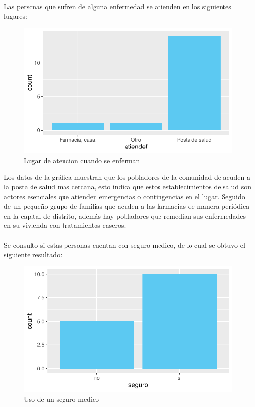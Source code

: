 \documentclass[12pt]{article}\usepackage[]{graphicx}\usepackage[]{xcolor}
\makeatletter
\def\maxwidth{ %
  \ifdim\Gin@nat@width>\linewidth
    \linewidth
  \else
    \Gin@nat@width
  \fi
}
\newenvironment{knitrout}{}{} %
\makeatother
\begin{document}
	\\
	Las personas que sufren de alguna enfermedad se atienden en los siguientes lugares:
	\begin{figure}[H]
	\centering
\begin{knitrout}
\color{fgcolor}
\includegraphics[width=\maxwidth]{figure/once-1} 
\end{knitrout}
	\caption{Lugar de atencion cuando se enferman}
	\end{figure}
  Los datos de la gráfica muestran que los pobladores de la comunidad de \comunidad acuden a la posta de salud mas cercana, esto indica que estos establecimientos de salud son actores esenciales que atienden emergencias o contingencias en el lugar. Seguido de un pequeño grupo de familias que acuden a las farmacias  de manera periódica en la capital de distrito, además hay pobladores que remedian sus enfermedades en su vivienda con tratamientos caseros.\\
  \\
	Se consulto si estas personas cuentan con seguro medico, de lo cual se obtuvo el siguiente resultado:
	\begin{figure}[H]
	\centering
\begin{knitrout}
\color{fgcolor}
\includegraphics[width=\maxwidth]{figure/doce-1} 
\end{knitrout}
	\caption{Uso de un seguro medico}
	\end{figure}
\end{document}
